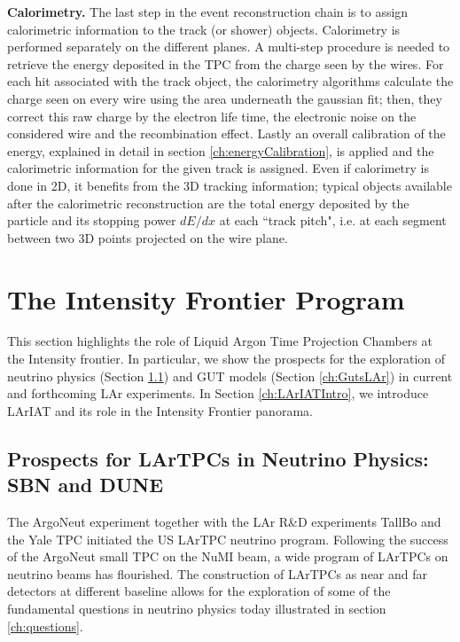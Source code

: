 \textbf{Calorimetry.} The last step in the event reconstruction chain is to assign calorimetric information to the track (or shower) objects. Calorimetry is performed separately on the different planes. A multi-step procedure is needed to retrieve the energy deposited in the TPC  from the charge seen by the wires.
For each hit associated with the track object, the calorimetry algorithms calculate the charge seen on every wire using the area underneath the gaussian fit; then, they correct this raw charge by the electron life time, the electronic noise on the considered wire and the recombination effect. Lastly an overall calibration of the energy, explained in detail in section \ref{ch:energyCalibration}, is applied and the calorimetric information for the given track is assigned.
Even if calorimetry is done in 2D, it benefits from the 3D tracking information; typical objects available after the calorimetric reconstruction are the total energy deposited by the particle and its stopping power $dE/dx$ at each ``track pitch", i.e. at each segment between two 3D points projected on the wire plane.



\section{The Intensity Frontier Program}
This section highlights the role of Liquid Argon Time Projection Chambers at the Intensity frontier. In particular, we show the prospects for the exploration of neutrino physics (Section \ref{ch:NuPhysLAr}) and GUT models (Section \ref{ch:GutsLAr}) in current and forthcoming LAr experiments. In Section \ref{ch:LArIATIntro}, we introduce LArIAT and its role in the Intensity Frontier panorama.

\subsection{Prospects for LArTPCs in Neutrino Physics: SBN and DUNE}\label{ch:NuPhysLAr}
The ArgoNeut  experiment \cite{ArgoNeuT-det} together with the LAr R\&D experiments TallBo and the Yale TPC  initiated the US LArTPC neutrino program. Following the success of the ArgoNeut small TPC on the NuMI beam, a wide program of LArTPCs on neutrino beams has flourished. The construction of  LArTPCs as near and far detectors at different baseline allows for the exploration of some of the fundamental questions in neutrino physics today illustrated in section \ref{ch:questions}. 

